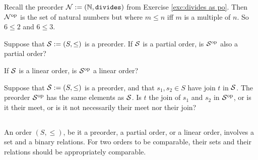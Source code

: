\begin{definitionRUS}\label{def:opposite order}
\end{definitionRUS}

\begin{exampleENG}
Recall the preorder $\mathcal{N}:=({\mathbb N},{\tt divides})$ from Exercise \ref{exc:divides as po}. Then $\mathcal{N}^\textnormal{op}$ is the set of natural numbers but where $m\leq n$ iff $m$ is a multiple of $n$. So $6\leq 2$ and $6\leq 3$.
\end{exampleENG}

\begin{exampleRUS}
\end{exampleRUS}

\begin{exerciseENG}
Suppose that $\mathcal{S}:=(S,\leq)$ is a preorder. 
\sexc If $\mathcal{S}$ is a partial order, is $\mathcal{S}^\textnormal{op}$ also a partial order? 
\item If $\mathcal{S}$ is a linear order, is $\mathcal{S}^\textnormal{op}$ a linear order?
\endsexc
\end{exerciseENG}

\begin{exerciseRUS}
\end{exerciseRUS}

\begin{exerciseENG}
Suppose that $\mathcal{S}:=(S,\leq)$ is a preorder, and that $s_1,s_2\in S$ have join $t$ in $\mathcal{S}$. The preorder $\mathcal{S}^\textnormal{op}$ has the same elements as $\mathcal{S}$. Is $t$ the join of $s_1$ and $s_2$ in $\mathcal{S}^\textnormal{op}$, or is it their meet, or is it not necessarily their meet nor their join?
\end{exerciseENG}

\begin{exerciseRUS}
\end{exerciseRUS}


\subsection{}

\begin{blockENG}
An order $(S,\leq)$, be it a preorder, a partial order, or a linear order, involves a set and a binary relations. For two orders to be comparable, their sets and their relations should be appropriately comparable.
\end{blockENG}

